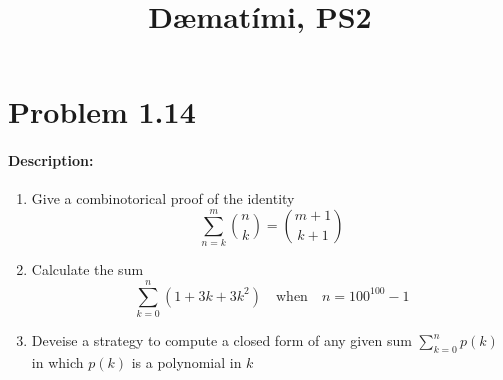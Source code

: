\documentclass[a4paper,notitlepage]{article}
\title{Dæmatími, PS2}
\date{}
\author{}
\theoremstyle{plain}
\theoremstyle{definition}
\begin{document}
\maketitle
\thispagestyle{firstpage}

\section*{Problem 1.14}
\paragraph{Description:}
\begin{enumerate}
    \item Give a combinotorical proof of the identity
    \begin{equation*}
        \sum_{n=k}^m \binom{n}{k} = \binom{m+1}{k+1}
    \end{equation*}

    \item Calculate the sum
    \begin{equation*}
        \sum_{k=0}^n (1+3k+3k^2) \quad \text{when} \quad n=100^{100}-1   
    \end{equation*}

    \item Deveise a strategy to compute a closed form of any given sum 
    $\displaystyle \sum_{k=0}^n p(k)$ in which $p(k)$ is a polynomial in $k$
\end{enumerate}
\end{document}
